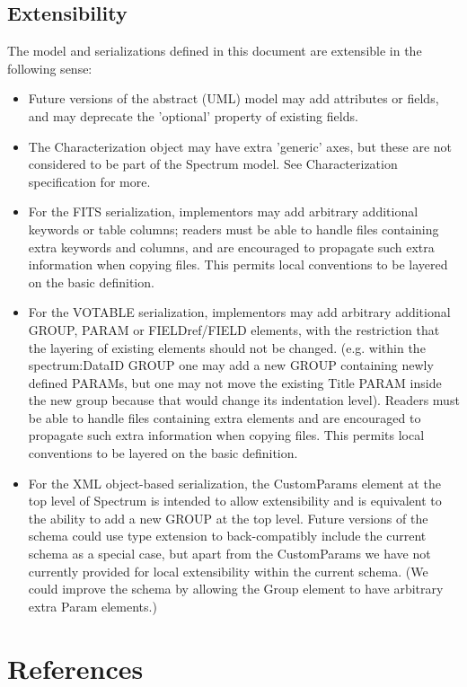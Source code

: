 \documentclass[11pt]{article}
\begin{document}
\subsection{Extensibility}

The model and serializations defined in this document are
extensible in the following sense:

\begin{itemize}
\item Future versions of the abstract (UML) model may add attributes
or fields, and may deprecate the 'optional' property of existing fields.
\item The Characterization object may have extra 'generic' axes, but
these are not considered to be part of the Spectrum model. See Characterization
specification for more.
\item For the FITS serialization, implementors may add arbitrary additional keywords
or table columns; readers must be able to handle files containing extra
keywords and columns, and are encouraged to propagate such extra information
when copying files. This permits local conventions to be layered on the
basic definition.
\item For the VOTABLE serialization, implementors may add arbitrary additional 
GROUP, PARAM or FIELDref/FIELD elements, with the restriction that
the layering of existing elements should not be changed. (e.g.
within the spectrum:DataID GROUP one may add a new GROUP containing
newly defined PARAMs, but one may not move the existing Title PARAM inside the
new group because that would change its indentation level).
Readers must be able to handle files containing extra elements
and are encouraged to propagate such extra information
when copying files. This permits local conventions to be layered on the
basic definition.
\item For the XML object-based serialization, 
the CustomParams element at the top level of Spectrum is intended
to allow extensibility and is equivalent to the ability to add a new
GROUP at the top level. Future versions of the schema could use
type extension to back-compatibly include the current schema as a special case, but
apart from the CustomParams we have not currently provided for
local extensibility within the current schema. (We could improve the
schema by allowing the Group element to have arbitrary extra Param elements.)

\end{itemize}

\section*{References}
\end{document}
